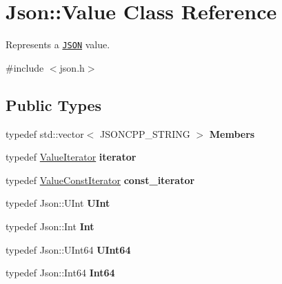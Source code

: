\hypertarget{classJson_1_1Value}{}\section{Json\+:\+:Value Class Reference}
\label{classJson_1_1Value}


Represents a \href{http://www.json.org}{\tt J\+S\+ON} value.  




{\ttfamily \#include $<$json.\+h$>$}

\subsection*{Public Types}
\begin{DoxyCompactItemize}
\item 
\mbox{\label{classJson_1_1Value_a9ae9069983fc38f1928d76f9c79ac64d}} 
typedef std\+::vector$<$ J\+S\+O\+N\+C\+P\+P\+\_\+\+S\+T\+R\+I\+NG $>$ {\bfseries Members}
\item 
\mbox{\label{classJson_1_1Value_a341cdf2e01f8b3c5b7317aa2f0768c53}} 
typedef \hyperlink{classJson_1_1ValueIterator}{Value\+Iterator} {\bfseries iterator}
\item 
\mbox{\label{classJson_1_1Value_af92282ca92b58b320debd486afb7696a}} 
typedef \hyperlink{classJson_1_1ValueConstIterator}{Value\+Const\+Iterator} {\bfseries const\+\_\+iterator}
\item 
\mbox{\label{classJson_1_1Value_a0933d59b45793ae4aade1757c322a98d}} 
typedef Json\+::\+U\+Int {\bfseries U\+Int}
\item 
\mbox{\label{classJson_1_1Value_abdf7a7ff73eb130ffcab28504ffdb405}} 
typedef Json\+::\+Int {\bfseries Int}
\item 
\mbox{\label{classJson_1_1Value_a8b62564be8c087c6d18de180ff4e13e3}} 
typedef Json\+::\+U\+Int64 {\bfseries U\+Int64}
\item 
\mbox{\label{classJson_1_1Value_a1b86af9f85f0f1baa972c3319fa22695}} 
typedef Json\+::\+Int64 {\bfseries Int64}
\item 

\end{DoxyCompactItemize}

